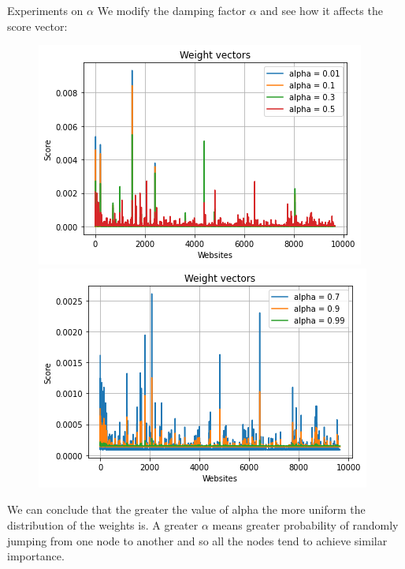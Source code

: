 \documentclass[10pt]{beamer}
\begin{document}
\begin{frame}{Experiments on $\alpha$}
We modify the damping factor $\alpha$ and see how it affects the score vector:

\begin{figure}[!tbp]
  \centering
  \begin{minipage}[b]{0.4\textwidth}
    \includegraphics[width=\textwidth]{alpha1}
  \end{minipage}
  \hfill
  \begin{minipage}[b]{0.4\textwidth}
    \includegraphics[width=\textwidth]{alpha2}
  \end{minipage}
\end{figure}
We can conclude that the greater the value of alpha the more uniform the distribution of the weights is. A greater $\alpha$ means greater probability of randomly jumping from one node to another and so all the nodes tend to achieve similar importance.

\end{frame}
\end{document}
